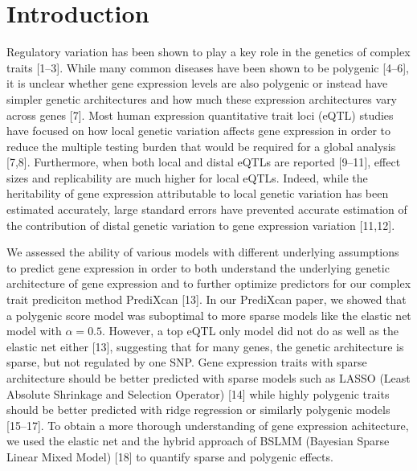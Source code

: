\documentclass[]{article}
\begin{document}

\section{Introduction}\label{introduction}

Regulatory variation has been shown to play a key role in the genetics
of complex traits {[}1--3{]}. While many common diseases have been shown
to be polygenic {[}4--6{]}, it is unclear whether gene expression levels
are also polygenic or instead have simpler genetic architectures and how
much these expression architectures vary across genes {[}7{]}. Most
human expression quantitative trait loci (eQTL) studies have focused on
how local genetic variation affects gene expression in order to reduce
the multiple testing burden that would be required for a global analysis
{[}7,8{]}. Furthermore, when both local and distal eQTLs are reported
{[}9--11{]}, effect sizes and replicability are much higher for local
eQTLs. Indeed, while the heritability of gene expression attributable to
local genetic variation has been estimated accurately, large standard
errors have prevented accurate estimation of the contribution of distal
genetic variation to gene expression variation {[}11,12{]}.

We assessed the ability of various models with different underlying
assumptions to predict gene expression in order to both understand the
underlying genetic architecture of gene expression and to further
optimize predictors for our complex trait prediciton method PrediXcan
{[}13{]}. In our PrediXcan paper, we showed that a polygenic score model
was suboptimal to more sparse models like the elastic net model with
\(\alpha=0.5\). However, a top eQTL only model did not do as well as the
elastic net either {[}13{]}, suggesting that for many genes, the genetic
architecture is sparse, but not regulated by one SNP. Gene expression
traits with sparse architecture should be better predicted with sparse
models such as LASSO (Least Absolute Shrinkage and Selection Operator)
{[}14{]} while highly polygenic traits should be better predicted with
ridge regression or similarly polygenic models {[}15--17{]}. To obtain a
more thorough understanding of gene expression achitecture, we used the
elastic net and the hybrid approach of BSLMM (Bayesian Sparse Linear
Mixed Model) {[}18{]} to quantify sparse and polygenic effects.
\end{document}
